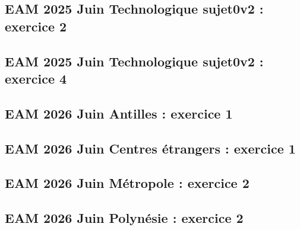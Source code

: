 \documentclass[lang=fr,edition=teacher,layout=sheet]{mxbook}
\begin{document}
\begingroup\endgroup
\par\bigskip
{}\subsection*{EAM 2025 Juin Technologique sujet0v2 : exercice 2}
\begingroup\endgroup
\par\bigskip
{}\subsection*{EAM 2025 Juin Technologique sujet0v2 : exercice 4}
\begingroup\endgroup
\par\bigskip
{}\subsection*{EAM 2026 Juin Antilles : exercice 1}
\begingroup\endgroup
\par\bigskip
{}\subsection*{EAM 2026 Juin Centres étrangers : exercice 1}
\begingroup\endgroup
\par\bigskip
{}\subsection*{EAM 2026 Juin Métropole : exercice 2}
\begingroup\endgroup
\par\bigskip
{}\subsection*{EAM 2026 Juin Polynésie : exercice 2}
\begingroup\endgroup
\end{document}
